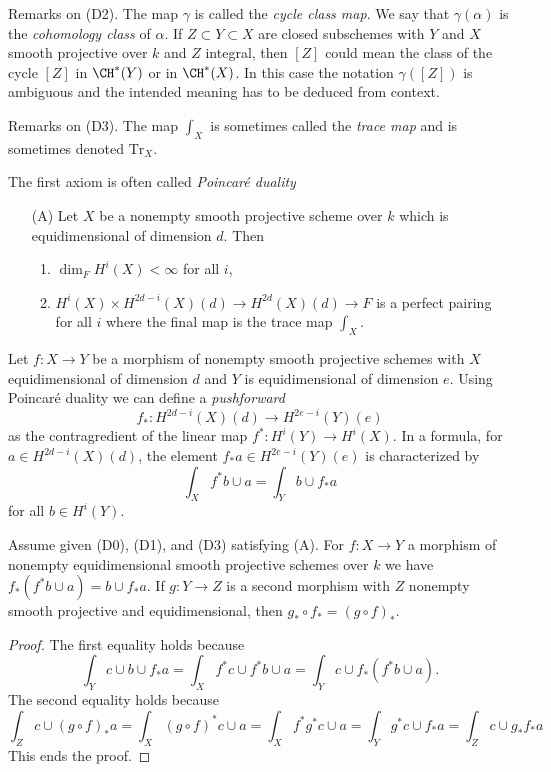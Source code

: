 \medskip\noindent
Remarks on (D2). The map $\gamma$ is called the {\it cycle class map}.
We say that $\gamma(\alpha)$ is the {\it cohomology class} of $\alpha$.
If $Z \subset Y \subset X$ are closed subschemes with $Y$ and $X$
smooth projective over $k$ and $Z$ integral, then $[Z]$ could
mean the class of the cycle $[Z]$ in $\CH^*(Y)$ or in $\CH^*(X)$.
In this case the notation $\gamma([Z])$ is ambiguous and the intended meaning
has to be deduced from context.

\medskip\noindent
Remarks on (D3). The map $\int_X$ is sometimes called the
{\it trace map} and is sometimes denoted $\text{Tr}_X$.

\medskip\noindent
The first axiom is often called {\it Poincar\'e duality}
\begin{enumerate}
\item[(A)] Let $X$ be a nonempty smooth projective scheme over $k$
which is equidimensional of dimension $d$. Then
\begin{enumerate}
\item $\dim_F H^i(X) < \infty$ for all $i$,
\item $H^i(X) \times H^{2d - i}(X)(d) \rightarrow
H^{2d}(X)(d) \rightarrow F$
is a perfect pairing for all $i$ where the final
map is the trace map $\int_X$.
\end{enumerate}
\end{enumerate}
Let $f : X \to Y$ be a morphism of nonempty smooth projective schemes with $X$
equidimensional of dimension $d$ and $Y$ is equidimensional of dimension $e$.
Using Poincar\'e duality we can define a {\it pushforward}
$$
f_* : H^{2d - i}(X)(d) \longrightarrow H^{2e - i}(Y)(e)
$$
as the contragredient of the linear map $f^* : H^i(Y) \to H^i(X)$. In a
formula, for $a \in H^{2d - i}(X)(d)$, the element $f_*a \in H^{2e - i}(Y)(e)$
is characterized by
$$
\int_X f^*b \cup a = \int_Y b \cup f_*a
$$
for all $b \in H^i(Y)$.

\begin{lemma}
\label{lemma-pushforward}
Assume given (D0), (D1), and (D3) satisfying (A). For $f : X \to Y$
a morphism of nonempty equidimensional smooth projective schemes over $k$
we have $f_*(f^*b \cup a) = b \cup f_*a$. If $g : Y \to Z$ is a second morphism
with $Z$ nonempty smooth projective and equidimensional, then
$g_* \circ f_* = (g \circ f)_*$.
\end{lemma}

\begin{proof}
The first equality holds because
$$
\int_Y c \cup b \cup f_*a =
\int_X f^*c \cup f^*b \cup a =
\int_Y c \cup f_*(f^*b \cup a).
$$
The second equality holds because
$$
\int_Z c \cup (g \circ f)_*a = \int_X (g \circ f)^*c \cup a =
\int_X f^* g^* c \cup a = \int_Y g^*c \cup f_*a = \int_Z c \cup g_*f_*a
$$
This ends the proof.
\end{proof}

